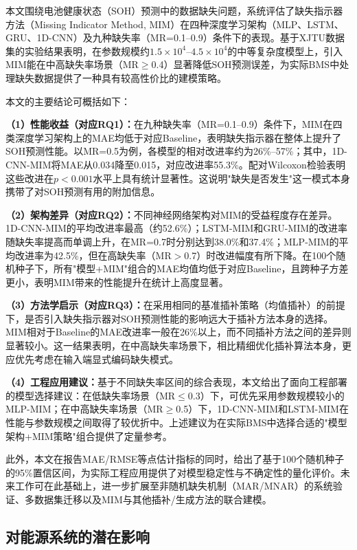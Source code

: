 \documentclass[10pt,a4paper]{ctexart}
\begin{document}
本文围绕电池健康状态（SOH）预测中的数据缺失问题，系统评估了缺失指示器方法（Missing Indicator Method, MIM）在四种深度学习架构（MLP、LSTM、GRU、1D-CNN）及九种缺失率（MR=0.1--0.9）条件下的表现。基于XJTU数据集的实验结果表明，在参数规模约$1.5\times 10^4$--$4.5\times 10^4$的中等复杂度模型上，引入MIM能在中高缺失率场景（MR$\geq$0.4）显著降低SOH预测误差，为实际BMS中处理缺失数据提供了一种具有较高性价比的建模策略。

本文的主要结论可概括如下：

\textbf{（1）性能收益（对应RQ1）：}在九种缺失率（MR=0.1--0.9）条件下，MIM在四类深度学习架构上的MAE均低于对应Baseline，表明缺失指示器在整体上提升了SOH预测性能。以MR=0.5为例，各模型的相对改进率约为26\%--57\%；其中，1D-CNN-MIM将MAE从0.034降至0.015，对应改进率55.3\%。配对Wilcoxon检验表明这些改进在$p<0.001$水平上具有统计显著性。这说明"缺失是否发生"这一模式本身携带了对SOH预测有用的附加信息。

\textbf{（2）架构差异（对应RQ2）：}不同神经网络架构对MIM的受益程度存在差异。1D-CNN-MIM的平均改进率最高（约52.6\%）；LSTM-MIM和GRU-MIM的改进率随缺失率提高而单调上升，在MR=0.7时分别达到38.0\%和37.4\%；MLP-MIM的平均改进率为42.5\%，但在高缺失率（MR$>$0.7）时改进幅度有所下降。在100个随机种子下，所有"模型+MIM"组合的MAE均值均低于对应Baseline，且跨种子方差更小，表明MIM带来的性能提升在统计上高度显著。

\textbf{（3）方法学启示（对应RQ3）：}在采用相同的基准插补策略（均值插补）的前提下，是否引入缺失指示器对SOH预测性能的影响远大于插补方法本身的选择。MIM相对于Baseline的MAE改进率一般在26\%以上，而不同插补方法之间的差异则显著较小。这一结果表明，在中高缺失率场景下，相比精细优化插补算法本身，更应优先考虑在输入端显式编码缺失模式。

\textbf{（4）工程应用建议：}基于不同缺失率区间的综合表现，本文给出了面向工程部署的模型选择建议：在低缺失率场景（MR$\leq$0.3）下，可优先采用参数规模较小的MLP-MIM；在中高缺失率场景（MR$\geq$0.5）下，1D-CNN-MIM和LSTM-MIM在性能与参数规模之间取得了较优折中。上述建议为在实际BMS中选择合适的"模型架构+MIM策略"组合提供了定量参考。

此外，本文在报告MAE/RMSE等点估计指标的同时，给出了基于100个随机种子的95\%置信区间，为实际工程应用提供了对模型稳定性与不确定性的量化评价。未来工作可在此基础上，进一步扩展至非随机缺失机制（MAR/MNAR）的系统验证、多数据集迁移以及MIM与其他插补/生成方法的联合建模。

\subsection{对能源系统的潜在影响}
\end{document}
